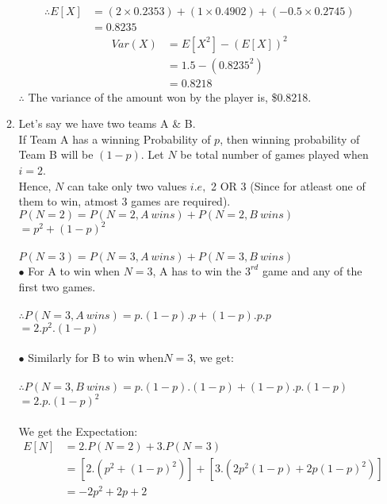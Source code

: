 \documentclass{article}
\begin{document}
\begin{enumerate}
\begin{enumerate}
\begin{align*}
            \therefore  E[X] &= (2\times 0.2353) + (1\times 0.4902) + (-0.5\times 0.2745)\\
            &= 0.8235
        \end{align*}
        \begin{align*}
            Var(X) &= E[X^2] - (E[X])^2\\
            &= 1.5 - (0.8235^2)\\
            &= 0.8218
        \end{align*}
        \(\therefore\) The variance of the amount won by the player is, \$0.8218.\\
    \item
        Let's say we have two teams A \& B.\\
        If Team A has a winning Probability of \(p\), then winning probability of Team B will be \((1-p)\).
        Let \(N\) be total number of games played when \(i=2\).\\
        Hence, \(N\) can take only two values \(i.e,\) 2 OR 3 (Since for atleast one of them to win, atmost 3 games are required).\\
        \(P(N=2) = P(N=2, A\ wins) + P(N=2, B\ wins)\)\\
        \(= p^2 + (1-p)^2\)\\\\
        \(P(N=3) = P(N=3, A\ wins) + P(N=3, B\ wins)\)\\
        $\bullet$ For A to win when \(N=3\), A has to win the \(3^{rd}\) game and any of the first two games.\\\\
        \(\therefore P(N=3, A\ wins) = p.(1-p).p + (1-p).p.p\)\\
        \(=2.p^2.(1-p)\)\\\\
        $\bullet$ Similarly for B to win when\(N=3\), we get:\\\\
        \(\therefore P(N=3, B\ wins) = p.(1-p).(1-p) + (1-p).p.(1-p)\)\\
        \(=2.p.(1-p)^2\)\\\\
        We get the Expectation:
        \begin{align*}
            E[N] &= 2.P(N=2) + 3.P(N=3)\\
            &= \left[2.\left(p^2 + (1-p)^2\right)\right] + \left[3.\left(2p^2(1-p) + 2p(1-p)^2\right)\right]\\
            &= -2p^2 + 2p + 2

\end{align*}
\end{enumerate}
\end{enumerate}
\end{document}
